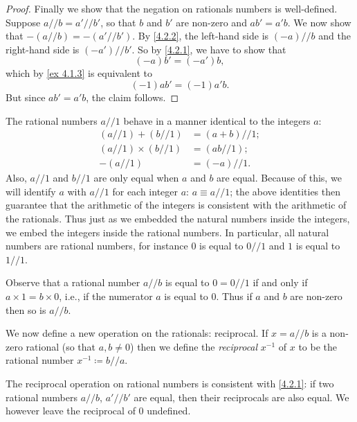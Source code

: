 \begin{proof}
  Finally we show that the negation on rationals numbers is well-defined.
  Suppose \(a // b = a' // b'\), so that \(b\) and \(b'\) are non-zero and \(ab' = a'b\).
  We now show that \(-(a // b) = -(a' // b')\).
  By \cref{4.2.2}, the left-hand side is \((-a) // b\) and the right-hand side is \((-a') // b'\).
  So by \cref{4.2.1}, we have to show that
  \[
    (-a)b' = (-a')b,
  \]
  which by \cref{ex 4.1.3} is equivalent to
  \[
    (-1)ab' = (-1)a'b.
  \]
  But since \(ab' = a'b\), the claim follows.
\end{proof}

\begin{note}
  The rational numbers \(a // 1\) behave in a manner identical to the integers \(a\):
  \begin{align*}
    (a // 1) + (b // 1)      & = (a + b) // 1; \\
    (a // 1) \times (b // 1) & = (ab // 1);    \\
    -(a // 1)                & = (-a) // 1.
  \end{align*}
  Also, \(a // 1\) and \(b // 1\) are only equal when \(a\) and \(b\) are equal.
  Because of this, we will identify \(a\) with \(a // 1\) for each integer \(a\): \(a \equiv a // 1\);
  the above identities then guarantee that the arithmetic of the integers is consistent with the arithmetic of the rationals.
  Thus just as we embedded the natural numbers inside the integers, we embed the integers inside the rational numbers.
  In particular, all natural numbers are rational numbers, for instance \(0\) is equal to \(0 // 1\) and \(1\) is equal to \(1 // 1\).
\end{note}

\begin{note}
  Observe that a rational number \(a // b\) is equal to \(0 = 0 // 1\) if and only if \(a \times 1 = b \times 0\), i.e., if the numerator \(a\) is equal to \(0\).
  Thus if \(a\) and \(b\) are non-zero then so is \(a // b\).
\end{note}

\begin{note}
  We now define a new operation on the rationals: reciprocal.
  If \(x = a // b\) is a non-zero rational (so that \(a, b \neq 0\)) then we define the \emph{reciprocal} \(x^{-1}\) of \(x\) to be the rational number \(x^{-1} \coloneqq b // a\).
\end{note}

\begin{additional corollary}\label{ac 4.2.2}
The reciprocal operation on rational numbers is consistent with \cref{4.2.1}:
if two rational numbers \(a // b\), \(a' // b'\) are equal, then their reciprocals are also equal.
We however leave the reciprocal of \(0\) undefined.
\end{additional corollary}

